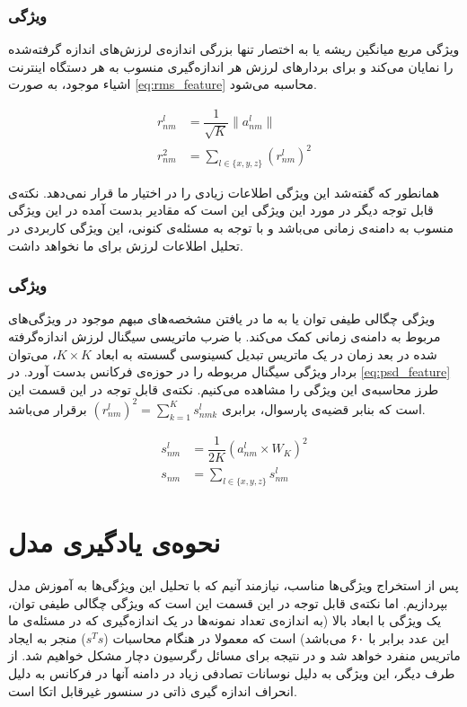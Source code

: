 \subsubsection{ویژگی }
ویژگی مربع میانگین ریشه یا به اختصار  تنها بزرگی اندازه‌ی لرزش‌های اندازه‌ گرفته‌شده را نمایان می‌کند و برای بردارهای لرزش هر اندازه‌گیری منسوب به هر دستگاه اینترنت اشیاء موجود، به صورت \cref{eq:rms_feature} محاسبه می‌شود.

\begin{equation}
\label{eq:rms_feature}
\begin{split} 
r^l_{nm} & = \dfrac{1}{\sqrt{K}}\|a^l_{nm}\|\\
r^2_{nm} &  = \sum_{l \in \{x, y, z\}} (r^l_{nm})^2
\end{split} 
\end{equation}

همانطور که گفته‌شد این ویژگی اطلاعات زیادی را در اختیار ما قرار نمی‌دهد. نکته‌ی قابل توجه دیگر در مورد این ویژگی این است که مقادیر بدست آمده در این ویژگی منسوب به دامنه‌ی زمانی می‌باشد و با توجه به مسئله‌ی کنونی، این ویژگی کاربردی در تحلیل اطلاعات لرزش برای ما نخواهد داشت.


\subsubsection{ویژگی }
ویژگی چگالی طیفی توان یا  به ما در یافتن مشخصه‌های مبهم موجود در ویژگی‌های مربوط به دامنه‌ی زمانی کمک می‌کند. با ضرب ماتریسی سیگنال لرزش اندازه‌گرفته شده در بعد زمان در یک ماتریس تبدیل کسینوسی گسسته به ابعاد $K \times K$، می‌توان بردار ویژگی سیگنال مربوطه را در حوزه‌ی فرکانس بدست آورد. در \cref{eq:psd_feature} طرز محاسبه‌ی این ویژگی را مشاهده می‌کنیم. نکته‌ی قابل توجه در این قسمت این است که بنابر قضیه‌ی پارسوال، برابری $(r^l_{nm})^2 = \sum_{k = 1}^{K}s^l_{nmk}$ برقرار می‌باشد.

\begin{equation}
\label{eq:psd_feature}
\begin{split} 
s^l_{nm} & = \dfrac{1}{2K}(a^l_{nm} \times W_K)^2\\
s_{nm} &  = \sum_{l \in \{x, y, z\}} s^l_{nm}
\end{split} 
\end{equation}

\section{نحوه‌ی یادگیری مدل}
پس از استخراج ویژگی‌ها مناسب، نیازمند آنیم که با تحلیل این ویژگی‌ها به آموزش مدل بپردازیم. اما نکته‌ی قابل توجه در این قسمت این است که ویژگی چگالی طیفی توان، یک ویژگی با ابعاد بالا (به اندازه‌ی تعداد نمونه‌ها در یک اندازه‌گیری که در مسئله‌ی ما این عدد برابر با ۶۰ می‌باشد) است که معمولا در هنگام محاسبات ($s^Ts$) منجر به ایجاد ماتریس منفرد خواهد شد و در نتیجه برای مسائل رگرسیون دچار مشکل خواهیم شد. از طرف دیگر، این ویژگی به دلیل نوسانات تصادفی زیاد در دامنه آنها در فرکانس به دلیل انحراف اندازه گیری ذاتی در سنسور  غیرقابل اتکا است.

